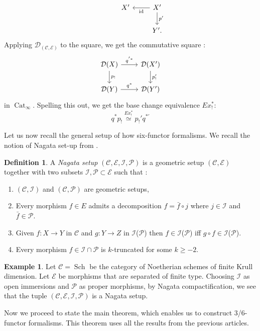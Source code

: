 \documentclass[14pt]{article}
\theoremstyle{definition}
\newtheorem{definition}[theorem]{Definition}
\newtheorem{example}[theorem]{Example}
\newcommand{\E}{\mathcal{E}}
\newcommand{\D}{\mathcal{D}}
\renewcommand{\P}{\mathcal{P}}
\newcommand{\op}[1]{\operatorname{#1}}
\newcommand{\I}{\mathscr{I}}
\newcommand{\Ca}{\mathcal{C}}
\numberwithin{subsection}{section}
\begin{document}
\begin{enumerate}
\begin{itemize}
\begin{equation*}
\begin{tikzcd}
            {} & X' & X'\arrow[l,"\op{id}"]\arrow[d,"p'"]\\
            {} & {} & Y'.
        \end{tikzcd}
    \end{equation*}
    Applying $\D_{(\Ca,\E)}$ to the square, we get the commutative square :
    \begin{equation*}
        \begin{tikzcd}
            \D(X) \arrow[r,"q^{'*}"] \arrow[d,"p_!"] & \D(X') \arrow[d,"p'_!"]\\
            \D(Y) \arrow[r,"q^*"] & \D(Y')
        \end{tikzcd}
    \end{equation*}
    in $\op{Cat}_{\infty}$. Spelling this out, we get the base change equivalence $Ex^*_!$:
    \begin{equation}\label{App.:_Base_Change_Ex*_!}
    	q^*p_!\stackrel{Ex^*_!}{\simeq} p_!'q^{*'}
    \end{equation}
    
\end{itemize}
\end{enumerate}

Let us now recall the general setup of how six-functor formalisms. We recall the notion of Nagata set-up from \cite{dauser2025uniquenesssixfunctorformalisms}.
 \begin{definition}\cite[Definition 2.1]{dauser2025uniquenesssixfunctorformalisms}
     A \textit{Nagata setup} $(\Ca,\E,\I,\P)$ is a geometric setup $(\Ca,\E)$ together with two subsets $\I,\P \subset \E$ such that :
     \begin{enumerate}
         \item $(\Ca,\I)$ and $(\Ca,\P)$ are geometric setups,
         \item Every morphism $f \in E$ admits a decomposition $f = \bar{f} \circ j$ where $j \in \I$ and $\bar{f} \in \P$.
         \item  Given $f : X \to Y$ in $\Ca$ and $g: Y \to Z$ in $\I$($\P$) then $f \in \I$($\P$) iff $g \circ f \in \I$($\P$).
         \item Every morphism $f \in \I \cap \P$ is $k$-truncated for some $k \ge -2$. 
         \end{enumerate}
 \end{definition}
 \begin{example}
     Let $\Ca=\op{Sch}$ be the category of Noetherian schemes of finite Krull dimension. Let $\E$ be morphisms that are separated of finite type. Choosing $\I$ as open immersions and $\P$ as proper morphisms, by Nagata compactification, we see that the tuple $(\Ca,\E,\I,\P)$ is a Nagata setup. 
 \end{example}
Now we proceed to state the main theorem, which enables us to construct $3$/$6$-functor formalisms. This theorem uses all the results from the previous articles.
\end{document}
